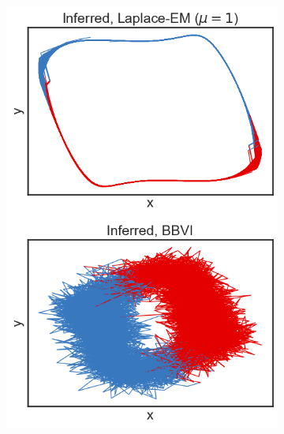 \begin{figure}
    \begin{subfigure}[b]{0.33\linewidth}
        \centering
        \includegraphics[width=\linewidth]{./Figures/vdp-bad-mu1.png}
        \caption{}
        \label{badvdp:a}
        \vspace{4ex}
    \end{subfigure}%
    \begin{subfigure}[b]{0.33\linewidth}
        \centering

\end{subfigure}
\end{figure}
